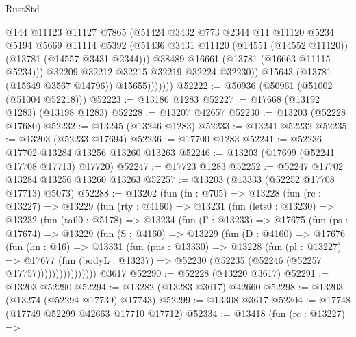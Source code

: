 \begin{lexlean}{RustStd}
\begin{coremodule}
                      @144
                      @11123
                      @11127
                      @7865
                      (@51424
                        @3432
                        @773
                        @2344
                        @11
                        @11120
                        @5234
                        @5194
                        @5669
                        @11114
                        @5392
                        (@51436 @3431 @11120 (@14551 (@14552 @11120)) (@13781 (@14557 @3431 @2344)))
                        @38489
                        @16661
                        (@13781 (@16663 @11115 @5234)))
                      @32209
                      @32212
                      @32215
                      @32219
                      @32224
                      @32230))
                  @15643
                  (@13781 (@15649 @3567 @14796))
                  @15655)))))))
@52222 := @50936 (@50961 (@51002 (@51004 @52218)))
@52223 := @13186 @1283
@52227 := @17668 (@13192 @1283) (@13198 @1283)
@52228 := @13207 @42657
@52230 := @13203 (@52228 @17680)
@52232 := @13245 (@13246 @1283)
@52233 := @13241 @52232
@52235 := @13203 (@52233 @17694)
@52236 := @17700 @1283
@52241 := @52236 @17702 @13284 @13256 @13260 @13263
@52246 := @13203 (@17699 (@52241 @17708 @17713) @17720)
@52247 := @17723 @1283
@52252 := @52247 @17702 @13284 @13256 @13260 @13263
@52257 := @13203 (@13333 (@52252 @17708 @17713) @5073)
@52288 := @13202
    (fun (fn : @705) =>
    @13228
      (fun (rc : @13227) =>
      @13229
        (fun (rty : @4160) =>
        @13231
          (fun (lets0 : @13230) =>
          @13232
            (fun (tail0 : @5178) =>
            @13234
              (fun (Γ : @13233) =>
              @17675
                (fun (ps : @17674) =>
                @13229
                  (fun (S : @4160) =>
                  @13229
                    (fun (D : @4160) =>
                    @17676
                      (fun (hn : @16) =>
                      @13331
                        (fun (pns : @13330) =>
                        @13228
                          (fun (pl : @13227) =>
                          @17677
                            (fun (bodyL : @13237) =>
                            @52230 (@52235 (@52246 (@52257 @17757))))))))))))))))
    @3617
@52290 := @52228 (@13220 @3617)
@52291 := @13203 @52290
@52294 := @13282 (@13283 @3617) @42660
@52298 := @13203 (@13274 (@52294 @17739) @17743)
@52299 := @13308 @3617
@52304 := @17748 (@17749 @52299 @42663 @17710 @17712)
@52334 := @13418
    (fun (rc : @13227) =>

\end{coremodule}
\end{lexlean}
